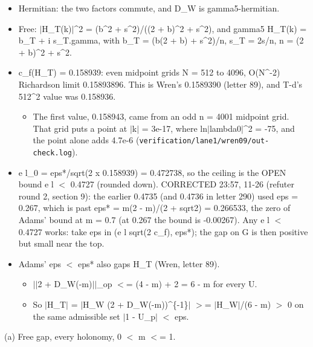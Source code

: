 \documentclass[11pt,a4paper]{article}
\begin{document}
\begin{itemize}
\item{} Hermitian: the two factors commute, and D\_W is gamma5-hermitian.
\item{} Free: $|$H\_T(k)$|$\textasciicircum{}2 = (b\textasciicircum{}2 + s\textasciicircum{}2)/((2 + b)\textasciicircum{}2 + s\textasciicircum{}2), and gamma5 H\_T(k) = b\_T + i s\_T.gamma, with
b\_T = (b(2 + b) + s\textasciicircum{}2)/n, s\_T = 2s/n, n = (2 + b)\textasciicircum{}2 + s\textasciicircum{}2.
\item{} c\_f(H\_T) = 0.158939: even midpoint grids N = 512 to 4096, O(N\textasciicircum{}-2) Richardson limit 0.15893896. This is Wren's
0.1589390 (letter 89), and T-d's 512\textasciicircum{}2 value was 0.158936.
\begin{itemize}
\item{} The first value, 0.158943, came from an odd n = 4001 midpoint grid. That grid puts a point at $|$k$|$ = 3e-17, where
ln$|$lambda0$|$\textasciicircum{}2 = -75, and the point alone adds 4.7e-6 (\texttt{verification/\allowbreak{}lane1/\allowbreak{}wren09/\allowbreak{}out-check.log}).
\end{itemize}

\item{} e l\_0 = eps*/sqrt(2 x 0.158939) = 0.472738, so the ceiling is the OPEN bound e l $<$ 0.4727 (rounded down). CORRECTED
23:57, 11-26 (refuter round 2, section 9): the earlier 0.4735 (and 0.4736 in letter 290) used eps = 0.267, which is past
eps* = m(2 - m)/(2 + sqrt2) = 0.266533, the zero of Adams' bound at m = 0.7 (at 0.267 the bound is -0.00267). Any
e l $<$ 0.4727 works: take eps in (e l sqrt(2 c\_f), eps*); the gap on G is then positive but small near the top.
\item{} Adams' eps $<$ eps* also gaps H\_T (Wren, letter 89).
\begin{itemize}
\item{} $|$$|$2 + D\_W(-m)$|$$|$\_op $<$= (4 - m) + 2 = 6 - m for every U.
\item{} So $|$H\_T$|$ = $|$H\_W (2 + D\_W(-m))\textasciicircum{}\{-1\}$|$ $>$= $|$H\_W$|$/(6 - m) $>$ 0 on the same admissible set $|$1 - U\_p$|$ $<$ eps.
\end{itemize}

\end{itemize}

(a) Free gap, every holonomy, 0 $<$ m $<$= 1.
\end{document}
